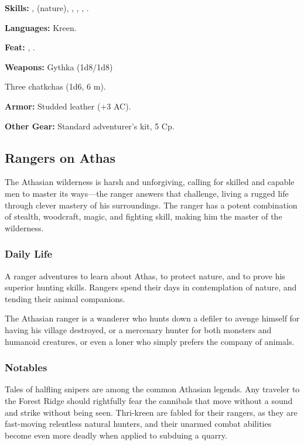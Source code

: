 \textbf{Skills:} ,  (nature), , , , .

\textbf{Languages:} Kreen.

\textbf{Feat:} , .

\textbf{Weapons:} Gythka (1d8/1d8)

Three chatkchas (1d6, 6 m).

\textbf{Armor:} Studded leather (+3 AC).

\textbf{Other Gear:} Standard adventurer's kit, 5 Cp.

\subsection{Rangers on Athas}

The Athasian wilderness is harsh and unforgiving, calling for skilled and capable men to master its ways---the ranger answers that challenge, living a rugged life through clever mastery of his surroundings. The ranger has a potent combination of stealth, woodcraft, magic, and fighting skill, making him the master of the wilderness.

\subsubsection{Daily Life}

A ranger adventures to learn about Athas, to protect nature, and to prove his superior hunting skills. Rangers spend their days in contemplation of nature, and tending their animal companions.

The Athasian ranger is a wanderer who hunts down a defiler to avenge himself for having his village destroyed, or a mercenary hunter for both monsters and humanoid creatures, or even a loner who simply prefers the company of animals.

\subsubsection{Notables}

Tales of halfling snipers are among the common Athasian legends. Any traveler to the Forest Ridge should rightfully fear the cannibals that move without a sound and strike without being seen. Thri-kreen are fabled for their rangers, as they are fast-moving relentless natural hunters, and their unarmed combat abilities become even more deadly when applied to subduing a quarry.

